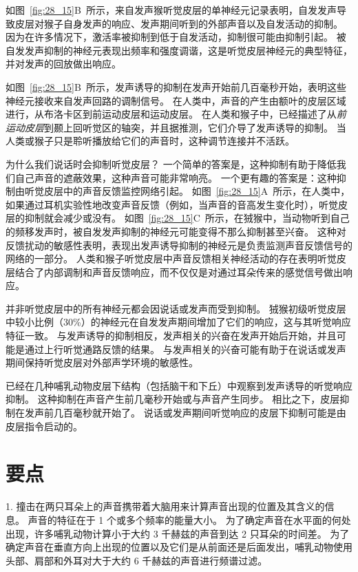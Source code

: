 如图~\ref{fig:28_15}B~所示，来自发声猴听觉皮层的单神经元记录表明，自发发声导致皮层对猴子自身发声的响应、发声期间听到的外部声音以及自发活动的抑制。
因为在许多情况下，激活率被抑制到低于自发活动，抑制很可能由抑制引起。
被自发发声抑制的神经元表现出频率和强度调谐，这是听觉皮层神经元的典型特征，并对发声的回放做出响应。


如图~\ref{fig:28_15}B~所示，发声诱导的抑制在发声开始前几百毫秒开始，表明这些神经元接收来自发声回路的调制信号。
在人类中，声音的产生由额叶的皮层区域进行，从布洛卡区到前运动皮层和运动皮层。
在人类和猴子中，已经描述了从\textit{前运动皮层}到颞上回听觉区的轴突，并且据推测，它们介导了发声诱导的抑制。
当人类或猴子只是聆听播放给它们的声音时，这种调节连接并不活跃。


为什么我们说话时会抑制听觉皮层？
一个简单的答案是，这种抑制有助于降低我们自己声音的遮蔽效果，这种声音可能非常响亮。
一个更有趣的答案是：这种抑制由听觉皮层中的声音反馈监控网络引起。
如图~\ref{fig:28_15}A~所示，在人类中，如果通过耳机实验性地改变声音反馈（例如，当声音的音高发生变化时），听觉皮层的抑制就会减少或没有。
如图~\ref{fig:28_15}C~所示，在狨猴中，当动物听到自己的频移发声时，被自发发声抑制的神经元可能变得不那么抑制甚至兴奋。
这种对反馈扰动的敏感性表明，表现出发声诱导抑制的神经元是负责监测声音反馈信号的网络的一部分。
人类和猴子听觉皮层中声音反馈相关神经活动的存在表明听觉皮层结合了内部调制和声音反馈响应，而不仅仅是对通过耳朵传来的感觉信号做出响应。


并非听觉皮层中的所有神经元都会因说话或发声而受到抑制。
狨猴初级听觉皮层中较小比例（30\%）的神经元在自发发声期间增加了它们的响应，这与其听觉响应特征一致。
与发声诱导的抑制相反，发声相关的兴奋在发声开始后开始，并且可能是通过上行听觉通路反馈的结果。
与发声相关的兴奋可能有助于在说话或发声期间保持听觉皮层对外部声学环境的敏感性。


已经在几种哺乳动物皮层下结构（包括脑干和下丘）中观察到发声诱导的听觉响应抑制。
这种抑制在声音产生前几毫秒开始或与声音产生同步。
相比之下，皮层抑制在发声前几百毫秒就开始了。
说话或发声期间听觉响应的皮层下抑制可能是由皮层指令启动的。



\section{要点}

1. 撞击在两只耳朵上的声音携带着大脑用来计算声音出现的位置及其含义的信息。
声音的特征在于 1 个或多个频率的能量大小。
为了确定声音在水平面的何处出现，许多哺乳动物计算小于大约 3 千赫兹的声音到达 2 只耳朵的时间差。
为了确定声音在垂直方向上出现的位置以及它们是从前面还是后面发出，哺乳动物使用头部、肩部和外耳对大于大约 6 千赫兹的声音进行频谱过滤。 


